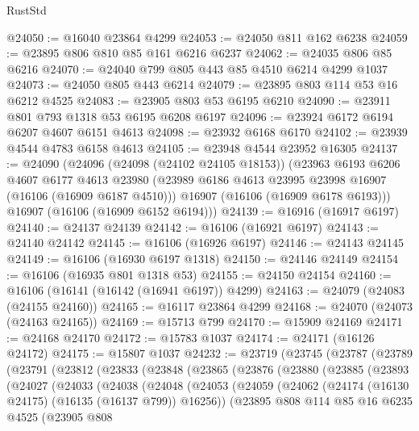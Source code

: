 \begin{lexlean}{RustStd}
\begin{coremodule}
@24050 := @16040 @23864 @4299
@24053 := @24050 @811 @162 @6238
@24059 := @23895 @806 @810 @85 @161 @6216 @6237
@24062 := @24035 @806 @85 @6216
@24070 := @24040 @799 @805 @443 @85 @4510 @6214 @4299 @1037
@24073 := @24050 @805 @443 @6214
@24079 := @23895 @803 @114 @53 @16 @6212 @4525
@24083 := @23905 @803 @53 @6195 @6210
@24090 := @23911 @801 @793 @1318 @53 @6195 @6208 @6197
@24096 := @23924 @6172 @6194 @6207 @4607 @6151 @4613
@24098 := @23932 @6168 @6170
@24102 := @23939 @4544 @4783 @6158 @4613
@24105 := @23948 @4544 @23952 @16305
@24137 := @24090
    (@24096
      (@24098 (@24102 @24105 @18153))
      (@23963
        @6193
        @6206
        @4607
        @6177
        @4613
        @23980
        (@23989 @6186 @4613 @23995 @23998 @16907 (@16106 (@16909 @6187 @4510)))
        @16907
        (@16106 (@16909 @6178 @6193)))
      @16907
      (@16106 (@16909 @6152 @6194)))
@24139 := @16916 (@16917 @6197)
@24140 := @24137 @24139
@24142 := @16106 (@16921 @6197)
@24143 := @24140 @24142
@24145 := @16106 (@16926 @6197)
@24146 := @24143 @24145
@24149 := @16106 (@16930 @6197 @1318)
@24150 := @24146 @24149
@24154 := @16106 (@16935 @801 @1318 @53)
@24155 := @24150 @24154
@24160 := @16106 (@16141 (@16142 (@16941 @6197)) @4299)
@24163 := @24079 (@24083 (@24155 @24160))
@24165 := @16117 @23864 @4299
@24168 := @24070 (@24073 (@24163 @24165))
@24169 := @15713 @799
@24170 := @15909 @24169
@24171 := @24168 @24170
@24172 := @15783 @1037
@24174 := @24171 (@16126 @24172)
@24175 := @15807 @1037
@24232 := @23719
    (@23745
      (@23787
        (@23789
          (@23791
            (@23812
              (@23833
                (@23848
                  (@23865
                    (@23876
                      (@23880
                        (@23885
                          (@23893
                            (@24027
                              (@24033
                                (@24038
                                  (@24048
                                    (@24053
                                      (@24059
                                        (@24062
                                          (@24174 (@16130 @24175) (@16135 (@16137 @799)) @16256))
                                        (@23895
                                          @808
                                          @114
                                          @85
                                          @16
                                          @6235
                                          @4525
                                          (@23905
                                            @808

\end{coremodule}
\end{lexlean}
